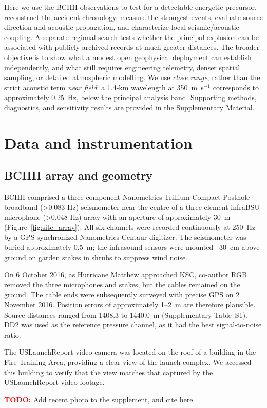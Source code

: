 \documentclass[]{seismica}
\newcommand{\todo}[1]{%
  \par\noindent
  \colorbox{yellow!40}{%
    \parbox{0.96\linewidth}{%
      \textbf{\textcolor{red}{TODO:}} #1
    }%
  }%
  \par
}
\begin{document}
Here we use the BCHH observations to test for a detectable energetic
precursor, reconstruct the accident chronology, measure the strongest events,
evaluate source direction and acoustic propagation, and characterize local
seismic/acoustic coupling. A separate regional search tests whether the
principal explosion can be associated with publicly archived records at much
greater distances. The broader objective is to show what a modest open
geophysical deployment can establish independently, and what still requires
engineering telemetry, denser spatial sampling, or detailed atmospheric
modelling. We use
\emph{close range}, rather than the strict
acoustic term \emph{near field}: a 1.4-km wavelength at 350~m~s$^{-1}$
corresponds to approximately 0.25~Hz, below the principal analysis band.
Supporting methods, diagnostics, and sensitivity results are provided in the
Supplementary Material.

\section{Data and instrumentation}
\label{sec:data}

\subsection{BCHH array and geometry}

BCHH comprised a three-component Nanometrics Trillium Compact Posthole
broadband (>0.083 Hz) seismometer near the centre of a three-element infraBSU microphone (>0.048 Hz) array with an
aperture of approximately 30~m (Figure~\ref{fig:site_array}). All six channels
were recorded continuously at 250~Hz by a GPS-synchronized Nanometrics
Centaur digitizer. The seismometer was buried approximately 0.5~m; the infrasound sensors
were mounted ~30~cm above ground on garden stakes in shrubs to suppress wind noise.

On 6 October 2016, as Hurricane Matthew approached KSC, co-author RGB 
removed the three microphones and stakes, but the cables remained on 
the ground. The cable ends were subsequently surveyed with precise GPS on
2 November 2016. Position errors of approximately 1--2~m are therefore plausible.
Source distances ranged from 1408.3 to 1440.0~m
(Supplementary Table~S1). DD2 was used as the reference
pressure channel, as it had the best signal-to-noise ratio.

The USLaunchReport video camera was located on the roof of a building in the Fire Training Area, providing a clear view of the launch complex.
We accessed this building to verify that the view matches that captured by the USLaunchReport video footage.
\todo{Add recent photo to the supplement, and cite here}
\end{document}
